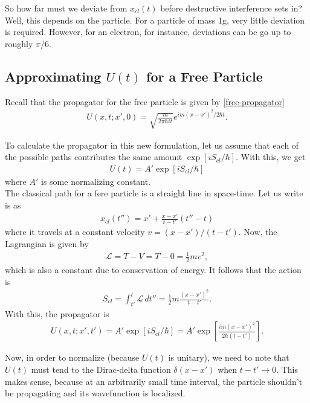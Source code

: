 \documentclass{book}
\theoremstyle{definition}
\newcommand{\lag}{\mathcal{L}}
\newcommand{\f}[2]{\frac{#1}{#2}}
\newcommand{\lb}{\left[}
\newcommand{\rb}{\right]}
\begin{document}
So how far must we deviate from $x_{cl}(t)$ before destructive interference sets in? Well, this depends on the particle. For a particle of mass 1g, very little deviation is required. However, for an electron, for instance, deviations can be go up to roughly $\pi/6$. 


\subsection{Approximating $U(t)$ for a Free Particle}

Recall that the propagator for the free particle is given by \eqref{free-propagator}
\begin{align}
U(x,t; x',0) = \sqrt{\f{m}{2\pi \hbar it}} e^{im(x-x')^2/2\hbar t}.
\end{align}

To calculate the propagator in this new formulation, let us assume that each of the possible paths contributes the same amount $\exp[iS_{cl}/\hbar]$. With this, we get
\begin{align}
U(t) = A' \exp[iS_{cl}/\hbar]
\end{align}
where $A'$ is some normalizing constant. \\

The classical path for a fere particle is a straight line in space-time. Let us write is as
\begin{align}
x_{cl}(t'') = x' + \f{x-x'}{t-t'}(t'' - t)
\end{align}
where it travels at a constant velocity $v = (x - x') / (t - t')$. Now, the Lagrangian is given by
\begin{align}
\lag = T - V = T - 0 = \f{1}{2}mv^2,
\end{align}
which is also a constant due to conservation of energy. It follows that the action is 
\begin{align}
S_{cl} = \int_{t'}^t \lag \,dt'' = \f{1}{2}m\f{(x-x')^2}{t-t'}.
\end{align}
With this, the propagator is 
\begin{align}
U(x,t;x',t') = A' \exp[iS_{cl}/\hbar] = A' \exp \lb \f{im(x-x')^2}{2\hbar (t - t')} \rb.
\end{align}

Now, in order to normalize (because $U(t)$ is unitary), we need to note that $U(t)$ must tend to the Dirac-delta function $\delta(x - x')$ when $t - t' \to 0$. This makes sense, because at an arbitrarily small time interval, the particle shouldn't be propagating and its wavefunction is localized. \\
\end{document}
